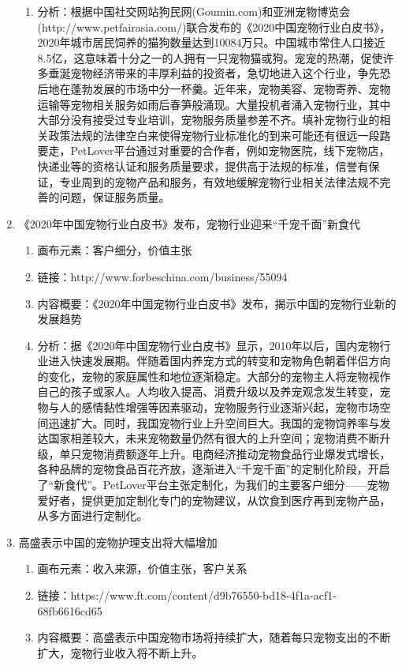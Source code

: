 \documentclass[a4paper]{ctexart}
\begin{document}
\begin{enumerate}[label=\alph*.]
\begin{enumerate}[label=\alph*.]
    \item 分析：根据中国社交网站狗民网(Goumin.com)和亚洲宠物博览会(http://www.petfairasia.com/)联合发布的《2020中国宠物行业白皮书》，2020年城市居民饲养的猫狗数量达到10084万只。中国城市常住人口接近8.5亿，这意味着十分之一的人拥有一只宠物猫或狗。宠宠的热潮，促使许多垂涎宠物经济带来的丰厚利益的投资者，急切地进入这个行业，争先恐后地在蓬勃发展的市场中分一杯羹。近年来，宠物美容、宠物寄养、宠物运输等宠物相关服务如雨后春笋般涌现。大量投机者涌入宠物行业，其中大部分没有接受过专业培训，宠物服务质量参差不齐。填补宠物行业的相关政策法规的法律空白来使得宠物行业标准化的到来可能还有很远一段路要走，PetLover平台通过对重要的合作者，例如宠物医院，线下宠物店，快递业等的资格认证和服务质量要求，提供高于法规的标准，信誉有保证，专业周到的宠物产品和服务，有效地缓解宠物行业相关法律法规不完善的问题，保证服务质量。
  \end{enumerate}
  \item 《2020年中国宠物行业白皮书》发布，宠物行业迎来“千宠千面”新食代
  \begin{enumerate}[label=\alph*.]
    \item 画布元素：客户细分，价值主张
    \item 链接：http://www.forbeschina.com/business/55094
    \item 内容概要：《2020年中国宠物行业白皮书》发布，揭示中国的宠物行业新的发展趋势
    \item 分析：据《2020年中国宠物行业白皮书》显示，2010年以后，国内宠物行业进入快速发展期。伴随着国内养宠方式的转变和宠物角色朝着伴侣方向的变化，宠物的家庭属性和地位逐渐稳定。大部分的宠物主人将宠物视作自己的孩子或家人。人均收入提高、消费升级以及养宠观念发生转变，宠物与人的感情黏性增强等因素驱动，宠物服务行业逐渐兴起，宠物市场空间迅速扩大。同时，我国宠物行业上升空间巨大。我国的宠物饲养率与发达国家相差较大，未来宠物数量仍然有很大的上升空间；宠物消费不断升级，单只宠物消费额逐年上升。电商经济推动宠物食品行业爆发式增长，各种品牌的宠物食品百花齐放，逐渐进入“千宠千面”的定制化阶段，开启了“新食代”。PetLover平台主张定制化，为我们的主要客户细分——宠物爱好者，提供更加定制化专门的宠物建议，从饮食到医疗再到宠物产品，从多方面进行定制化。
  \end{enumerate}
  \item 高盛表示中国的宠物护理支出将大幅增加
  \begin{enumerate}[label=\alph*.]
    \item 画布元素：收入来源，价值主张，客户关系
    \item 链接：https://www.ft.com/content/d9b76550-bd18-4f1a-acf1-68fb6616cd65
    \item 内容概要：高盛表示中国宠物市场将持续扩大，随着每只宠物支出的不断扩大，宠物行业收入将不断上升。

\end{enumerate}
\end{enumerate}
\end{document}
